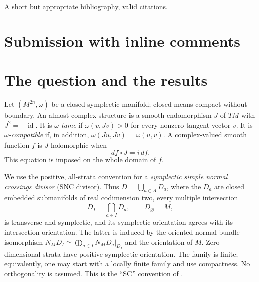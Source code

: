 \documentclass[11pt]{article}
\theoremstyle{definition}
\theoremstyle{remark}
\newcommand{\id}{\operatorname{id}}
\begin{document}
 A short but appropriate bibliography, valid citations.

\newpage
\section{Submission with inline comments}


\begin{abstract}
We study whether a symplectic simple normal crossings divisor admits local holomorphic defining coordinates for one tame almost complex structure, after a cohomologous symplectic deformation preserving the divisor. 
We prove the assertion in real dimension at most four, and for smooth divisors in dimension six. For a smooth divisor in any dimension we give an equivalent condition on holomorphic transition functions of its normal line. An explicit local example shows that invariance of the divisor and vanishing of the Nijenhuis tensor along it do not suffice for a prescribed almost complex structure. We also prove a conditional construction in arbitrary dimension from a finite collection of auxiliary divisors and compatible normal-bundle data. The realization of the full input to that construction is not established here; the unrestricted existence question remains unresolved in this paper.
\end{abstract}

\section{The question and the results}

Let $(M^{2n},\omega)$ be a closed symplectic manifold; closed means compact without boundary. An almost complex structure is a smooth endomorphism $J$ of $TM$ with $J^2=-\id$. It is \emph{$\omega$-tame} if $\omega(v,Jv)>0$ for every nonzero tangent vector $v$. It is \emph{$\omega$-compatible} if, in addition, $\omega(Ju,Jv)=\omega(u,v)$. A complex-valued smooth function $f$ is $J$-holomorphic when
\begin{equation}\label{eq:holomorphic}
 df\circ J=i\,df.
\end{equation}
This equation is imposed on the whole domain of $f$.

We use the positive, all-strata convention for a \emph{symplectic simple normal crossings divisor} (SNC divisor). Thus $D=\bigcup_{a\in A}D_a$, where the $D_a$ are closed embedded submanifolds of real codimension two, every multiple intersection
\[
 D_I=\bigcap_{a\in I}D_a,\qquad D_\varnothing=M,
\]
is transverse and symplectic, and its symplectic orientation agrees with its intersection orientation. The latter is induced by the oriented normal-bundle isomorphism
$N_MD_I\simeq\bigoplus_{a\in I}N_MD_a|_{D_I}$ and the orientation of $M$.
Zero-dimensional strata have positive symplectic orientation. The family is finite; equivalently, one may start with a locally finite family and use compactness. No orthogonality is assumed. This is the ``SC'' convention of \cite[Definition 2.1]{TMZ}.
\end{document}

